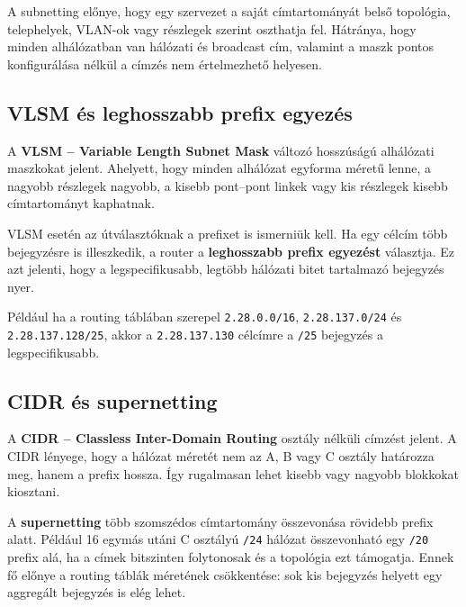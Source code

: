 A subnetting előnye, hogy egy szervezet a saját címtartományát belső topológia, telephelyek, VLAN-ok vagy részlegek szerint oszthatja fel. Hátránya, hogy minden alhálózatban van hálózati és broadcast cím, valamint a maszk pontos konfigurálása nélkül a címzés nem értelmezhető helyesen.

\subsection{VLSM és leghosszabb prefix egyezés}

A \textbf{VLSM -- Variable Length Subnet Mask} változó hosszúságú alhálózati maszkokat jelent. Ahelyett, hogy minden alhálózat egyforma méretű lenne, a nagyobb részlegek nagyobb, a kisebb pont--pont linkek vagy kis részlegek kisebb címtartományt kaphatnak.

VLSM esetén az útválasztóknak a prefixet is ismerniük kell. Ha egy célcím több bejegyzésre is illeszkedik, a router a \textbf{leghosszabb prefix egyezést} választja. Ez azt jelenti, hogy a legspecifikusabb, legtöbb hálózati bitet tartalmazó bejegyzés nyer.

Például ha a routing táblában szerepel \texttt{2.28.0.0/16}, \texttt{2.28.137.0/24} és \texttt{2.28.137.128/25}, akkor a \texttt{2.28.137.130} célcímre a \texttt{/25} bejegyzés a legspecifikusabb.

\subsection{CIDR és supernetting}

A \textbf{CIDR -- Classless Inter-Domain Routing} osztály nélküli címzést jelent. A CIDR lényege, hogy a hálózat méretét nem az A, B vagy C osztály határozza meg, hanem a prefix hossza. Így rugalmasan lehet kisebb vagy nagyobb blokkokat kiosztani.

A \textbf{supernetting} több szomszédos címtartomány összevonása rövidebb prefix alatt. Például 16 egymás utáni C osztályú \texttt{/24} hálózat összevonható egy \texttt{/20} prefix alá, ha a címek bitszinten folytonosak és a topológia ezt támogatja. Ennek fő előnye a routing táblák méretének csökkentése: sok kis bejegyzés helyett egy aggregált bejegyzés is elég lehet.

\begin{center}

\end{center}



